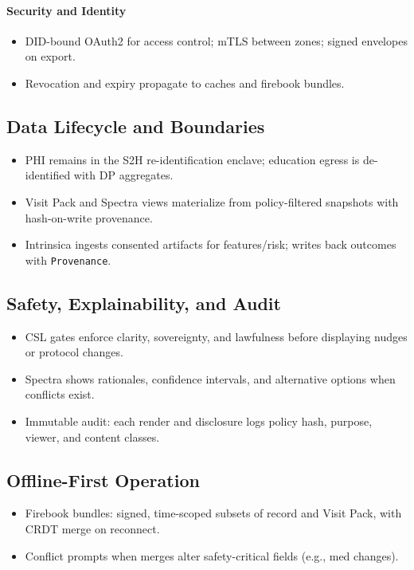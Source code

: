 \documentclass[11pt]{article}
\theoremstyle{plain}
\begin{document}
\paragraph{Security and Identity}
\begin{itemize}
  \item DID-bound OAuth2 for access control; mTLS between zones; signed envelopes on export.
  \item Revocation and expiry propagate to caches and firebook bundles.
\end{itemize}

\subsection{Data Lifecycle and Boundaries}
\begin{itemize}
  \item PHI remains in the S2H re-identification enclave; education egress is de-identified with DP aggregates.
  \item Visit Pack and Spectra views materialize from policy-filtered snapshots with hash-on-write provenance.
  \item Intrinsica ingests consented artifacts for features/risk; writes back outcomes with \texttt{Provenance}.
\end{itemize}

\subsection{Safety, Explainability, and Audit}
\begin{itemize}
  \item CSL gates enforce clarity, sovereignty, and lawfulness before displaying nudges or protocol changes.
  \item Spectra shows rationales, confidence intervals, and alternative options when conflicts exist.
  \item Immutable audit: each render and disclosure logs policy hash, purpose, viewer, and content classes.
\end{itemize}

\subsection{Offline-First Operation}
\begin{itemize}
  \item Firebook bundles: signed, time-scoped subsets of record and Visit Pack, with CRDT merge on reconnect.
  \item Conflict prompts when merges alter safety-critical fields (e.g., med changes).
\end{itemize}
\end{document}
